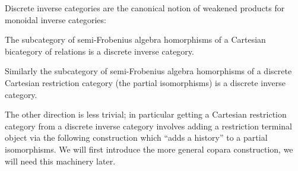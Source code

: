 Discrete inverse categories are the canonical notion of weakened products for monoidal inverse categories:

\begin{lemma}
The subcategory of semi-Frobenius algebra homorphisms of a Cartesian bicategory of relations is a discrete inverse category.

Similarly the subcategory of  semi-Frobenius algebra homorphisms of a discrete Cartesian restriction category (the partial isomorphisms) is a discrete inverse category.
\end{lemma}



The other direction is less trivial; in particular getting a Cartesian restriction category from a discrete inverse category involves adding a restriction terminal object via the following construction which ``adds a history'' to a partial isomorphisms.  We will first introduce the more general copara construction, we will need this machinery later.


